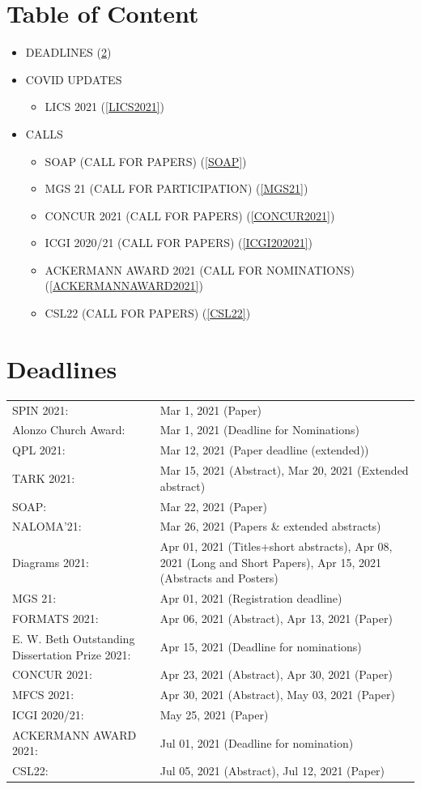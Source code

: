 \documentclass[prodmode,acmtecs]{acmsmall} %
\begin{document}
\section{Table of Content}\begin{itemize}\item DEADLINES (\cref{deadlines}) 
 
\item COVID UPDATES 
 
\begin{itemize}\item LICS 2021 (\cref{LICS2021})
\end{itemize} 
\item CALLS 
 
\begin{itemize}\item SOAP (CALL FOR PAPERS) (\cref{SOAP})
\item MGS 21 (CALL FOR PARTICIPATION) (\cref{MGS21})
\item CONCUR 2021 (CALL FOR PAPERS) (\cref{CONCUR2021})
\item ICGI 2020/21 (CALL FOR PAPERS) (\cref{ICGI202021})
\item ACKERMANN AWARD 2021 (CALL FOR NOMINATIONS) (\cref{ACKERMANNAWARD2021})
\item CSL22 (CALL FOR PAPERS) (\cref{CSL22})
\end{itemize} 
\end{itemize}\section{Deadlines}\label{deadlines}\begin{tabulary}{\linewidth}{LL}SPIN 2021:  & Mar 1, 2021 (Paper) \\
Alonzo Church Award:  & Mar 1, 2021 (Deadline for Nominations) \\
QPL 2021:  & Mar 12, 2021 (Paper deadline (extended)) \\
TARK 2021:  & Mar 15, 2021 (Abstract), Mar 20, 2021 (Extended abstract) \\
SOAP:  & Mar 22, 2021 (Paper) \\
NALOMA'21:  & Mar 26, 2021 (Papers \& extended abstracts) \\
Diagrams 2021:  & Apr 01, 2021 (Titles+short abstracts), Apr 08, 2021 (Long and Short Papers), Apr 15, 2021 (Abstracts and Posters) \\
MGS 21:  & Apr 01, 2021 (Registration deadline) \\
FORMATS 2021:  & Apr 06, 2021 (Abstract), Apr 13, 2021 (Paper) \\
E. W. Beth Outstanding Dissertation Prize 2021:  & Apr 15, 2021 (Deadline for nominations) \\
CONCUR 2021:  & Apr 23, 2021 (Abstract), Apr 30, 2021 (Paper) \\
MFCS 2021:  & Apr 30, 2021 (Abstract), May 03, 2021 (Paper) \\
ICGI 2020/21:  & May 25, 2021 (Paper) \\
ACKERMANN AWARD 2021:  & Jul 01, 2021 (Deadline for nomination) \\
CSL22:  & Jul 05, 2021 (Abstract), Jul 12, 2021 (Paper) \\
\end{tabulary}
\end{document}
